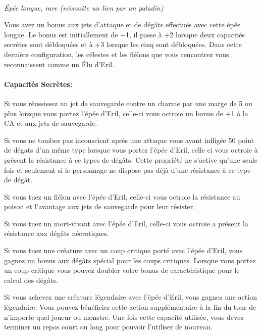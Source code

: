 \\
{\small \it Épée longue, rare (nécessite un lien par
un paladin)}\\
\label{EpeeEril}

Vous avez un bonus aux jets d'attaque et de dégâts effectués avec cette 
épée longue. Le bonus est initiallement de +1, il passe à +2 lorsque deux
capacités secrètes sont débloquées et à +3 lorsque les cinq sont débloquées.
Dans cette dernière configuration, les célestes et 
les fiélons que vous rencontrez vous reconnaissent comme un Élu d'Eril.

\paragraph{Capacités Secrètes:}

Si vous réussissez un jet de sauvegarde contre un charme par une marge
de 5 ou plus lorsque vous portez l'épée d'Eril, celle-ci vous octroie
un bonus de +1 à la CA et aux jets de sauvegarde.

Si vous ne tombez pas inconscient après une attaque vous ayant infligée
50 point de dégats d'un même type lorsque vous portez l'épée d'Eril,
celle ci vous octroie à présent la résistance à ce types de dégâts. Cette 
propriété ne s'active qu'une seule fois et seulement si le personnage ne
dispose pas déjà d'une résistance à ce type de dégât. 

Si vous tuez un fiélon avec l'épée d'Eril, celle-ci vous octroie
la résistance au poison et l'avantage aux jets de sauvegarde pour leur
résister.

Si vous tuez un mort-vivant avec l'épée d'Eril, celle-ci vous octroie
a présent la résistance aux dégâts nécrotiques.

Si vous tuez une créature avec un coup critique porté avec l'épée d'Eril,
vous gagnez un bonus aux dégâts spécial pour les coups critiques. Lorsque 
vous portez un coup critique
vous pouvez doubler votre bonus de caractéristique pour le calcul des dégâts.

Si vous achevez une créature légendaire avec l'épée d'Eril, vous gagnez
une action légendaire. Vous pouvez bénéficier cette action supplémentaire 
à la fin du tour de n'importe quel joueur ou monstre. Une fois cette capacité 
utilisée, vous devez terminer un repos court ou long pour pouvoir l'utiliser 
de nouveau. \\
